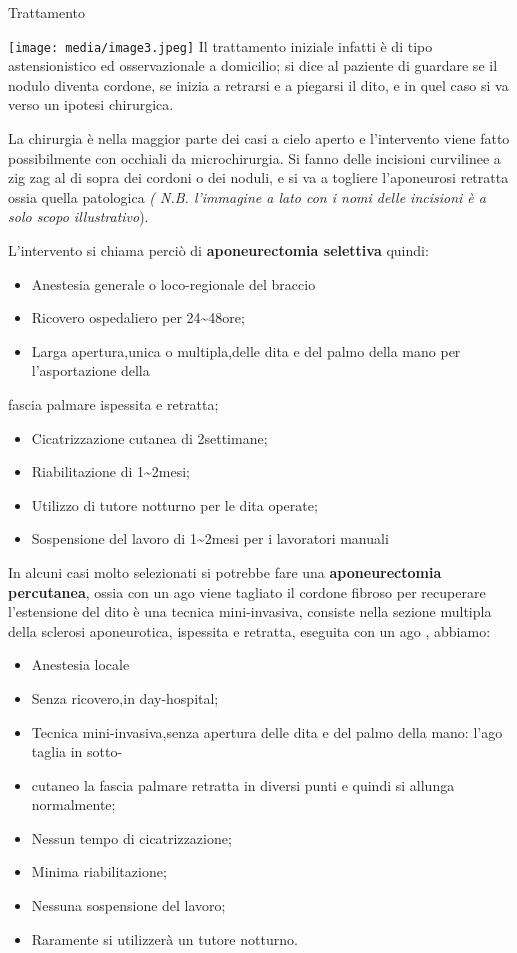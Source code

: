 \documentclass[]{article}
\begin{document}
Trattamento

\texttt{[image: media/image3.jpeg]} Il
trattamento iniziale infatti è di tipo astensionistico ed osservazionale
a domicilio; si dice al paziente di guardare se il nodulo diventa
cordone, se inizia a retrarsi e a piegarsi il dito, e in quel caso si va
verso un ipotesi chirurgica.

La chirurgia è nella maggior parte dei casi a cielo aperto e
l'intervento viene fatto possibilmente con occhiali da microchirurgia.
Si fanno delle incisioni curvilinee a zig zag al di sopra dei cordoni o
dei noduli, e si va a togliere l'aponeurosi retratta ossia quella
patologica \emph{( N.B. l'immagine a lato con i nomi delle incisioni è a
solo scopo illustrativo}).

L'intervento si chiama perciò di \textbf{aponeurectomia selettiva}
quindi:

\begin{itemize}
\item
  Anestesia generale o loco-regionale del braccio
\item
  Ricovero ospedaliero per 24\textasciitilde{}48ore;
\item
  Larga apertura,unica o multipla,delle dita e del palmo della mano per
  l'asportazione della
\end{itemize}

fascia palmare ispessita e retratta;

\begin{itemize}
\item
  Cicatrizzazione cutanea di 2settimane;
\item
  Riabilitazione di 1\textasciitilde{}2mesi;
\item
  Utilizzo di tutore notturno per le dita operate;
\item
  Sospensione del lavoro di 1\textasciitilde{}2mesi per i lavoratori
  manuali
\end{itemize}

In alcuni casi molto selezionati si potrebbe fare una
\textbf{aponeurectomia percutanea}, ossia con un ago viene tagliato il
cordone fibroso per recuperare l'estensione del dito è una tecnica
mini-invasiva, consiste nella sezione multipla della sclerosi
aponeurotica, ispessita e retratta, eseguita con un ago , abbiamo:

\begin{itemize}
\item
  Anestesia locale
\item
  Senza ricovero,in day-hospital;
\item
  Tecnica mini-invasiva,senza apertura delle dita e del palmo della
  mano: l'ago taglia in sotto-
\item
  cutaneo la fascia palmare retratta in diversi punti e quindi si
  allunga normalmente;
\item
  Nessun tempo di cicatrizzazione;
\item
  Minima riabilitazione;
\item
  Nessuna sospensione del lavoro;
\item
  Raramente si utilizzerà un tutore notturno.
\end{itemize}
\end{document}
